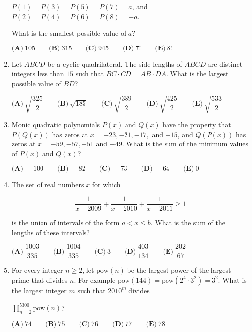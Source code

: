 \documentclass{article}
\begin{document}
\begin{enumerate}[label=\arabic*., itemsep=0.5em]
\begin{center}
\(P(1) = P(3) = P(5) = P(7) = a\), and\\

\(P(2) = P(4) = P(6) = P(8) = -a\).
\end{center}


What is the smallest possible value of \(a\)?

\(\textbf{(A)}\ 105 \qquad \textbf{(B)}\ 315 \qquad \textbf{(C)}\ 945 \qquad \textbf{(D)}\ 7! \qquad \textbf{(E)}\ 8!\)\par \vspace{0.5em}\item Let \(ABCD\) be a cyclic quadrilateral. The side lengths of \(ABCD\) are distinct integers less than \(15\) such that \(BC\cdot CD=AB\cdot DA\). What is the largest possible value of \(BD\)?

\(\textbf{(A)}\ \sqrt{\dfrac{325}{2}} \qquad \textbf{(B)}\ \sqrt{185} \qquad \textbf{(C)}\ \sqrt{\dfrac{389}{2}} \qquad \textbf{(D)}\ \sqrt{\dfrac{425}{2}} \qquad \textbf{(E)}\ \sqrt{\dfrac{533}{2}}\)\par \vspace{0.5em}\item Monic quadratic polynomials \(P(x)\) and \(Q(x)\) have the property that \(P(Q(x))\) has zeros at \(x=-23, -21, -17,\) and \(-15\), and \(Q(P(x))\) has zeros at \(x=-59,-57,-51\) and \(-49\). What is the sum of the minimum values of \(P(x)\) and \(Q(x)\)? 

\(\textbf{(A)}\ -100 \qquad \textbf{(B)}\ -82 \qquad \textbf{(C)}\ -73 \qquad \textbf{(D)}\ -64 \qquad \textbf{(E)}\ 0\)\par \vspace{0.5em}\item The set of real numbers \(x\) for which 


\begin{equation*}
\dfrac{1}{x-2009}+\dfrac{1}{x-2010}+\dfrac{1}{x-2011}\ge1
\end{equation*}


is the union of intervals of the form \(a<x\le b\). What is the sum of the lengths of these intervals?

\(\textbf{(A)}\ \dfrac{1003}{335} \qquad \textbf{(B)}\ \dfrac{1004}{335} \qquad \textbf{(C)}\ 3 \qquad \textbf{(D)}\ \dfrac{403}{134} \qquad \textbf{(E)}\ \dfrac{202}{67}\)\par \vspace{0.5em}\item For every integer \(n\ge2\), let \(\text{pow}(n)\) be the largest power of the largest prime that divides \(n\). For example \(\text{pow}(144)=\text{pow}(2^4\cdot3^2)=3^2\). What is the largest integer \(m\) such that \(2010^m\) divides

\begin{center}
\(\prod_{n=2}^{5300}\text{pow}(n)\)?
\end{center}



\(\textbf{(A)}\ 74 \qquad \textbf{(B)}\ 75 \qquad \textbf{(C)}\ 76 \qquad \textbf{(D)}\ 77 \qquad \textbf{(E)}\ 78\)\par \vspace{0.5em}
\end{enumerate}
\end{document}
